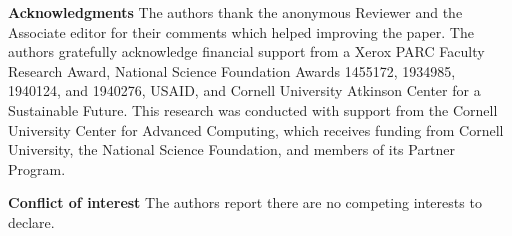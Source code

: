 \documentclass[12pt]{article}
\numberwithin{thm}{section}
\numberwithin{defn}{section}
\numberwithin{lem}{section}
\numberwithin{prop}{section}
\numberwithin{cor}{section}
\numberwithin{rem}{section}
\begin{document}
\noindent
\textbf{Acknowledgments} The authors thank the anonymous Reviewer and the Associate editor for their comments which helped improving the paper. 
The authors gratefully acknowledge financial support from a Xerox PARC Faculty Research Award, National Science Foundation Awards 1455172, 1934985, 1940124, and 1940276, USAID, and Cornell University Atkinson Center for a Sustainable Future.
This research was conducted with support from the Cornell University Center for Advanced Computing, which receives funding from Cornell University, the National Science Foundation, and members of its Partner Program.

\noindent
\textbf{Conflict of interest} The authors report there are no competing interests to declare.








\singlespacing
\small
%

% 

\end{document}
